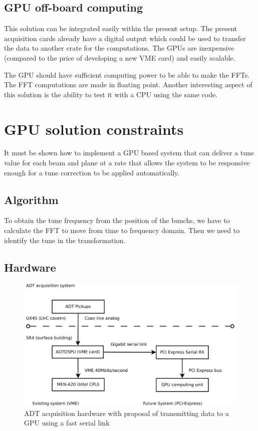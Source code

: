 \subsection{GPU off-board computing}

This solution can be integrated easily within the present setup. The present acquisition cards already have a digital output which could be used to transfer the data to another crate for the computations. The \glspl{GPU} are inexpensive (compared to the price of developing a new \gls{VME} card) and easily scalable. 

The \gls{GPU} should have sufficient computing power to be able to make the \glspl{FFT}. The \gls{FFT} computations are made in floating point. Another interesting aspect of this solution is the ability to test it with a \gls{CPU} using the same code.

\section{GPU solution constraints}

It must be shown how to implement a GPU based system that can deliver a tune value for each beam and plane at a rate that allows the system to be responsive enough for a tune correction to be applied automatically.

\subsection{Algorithm}

To obtain the tune frequency from the position of the \glspl{bunch}, we have to calculate the FFT to move from time to frequency domain. Then we need to identify the tune in the transformation.

\subsection{Hardware}

\begin{figure}[H]
\caption{ADT acquisition hardware with proposal of transmitting data to a GPU using a fast serial link}
\centering
\includegraphics[scale=0.3]{acquisition.pdf}
\end{figure}

